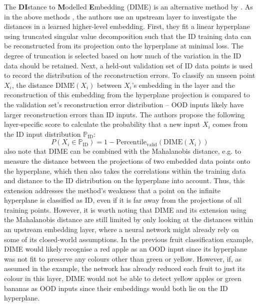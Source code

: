 \newpar The \textbf{DI}stance to \textbf{M}odelled \textbf{E}mbedding (DIME) is an alternative method by \textcite{dime-detector-2021}. As in the above methods \cite{ood-adversarial-detection-2018, ood-class-2022}, the authors use an upstream layer to investigate the distances in a learned higher-level embedding. First, they fit a linear hyperplane using truncated singular value decomposition such that the ID training data can be reconstructed from its projection onto the hyperplane at minimal loss. The degree of truncation is selected based on how much of the variation in the ID data should be retained. Next, a held-out validation set of ID data points is used to record the distribution of the reconstruction errors. To classify an unseen point $X_i$, the distance $\text{DIME}(X_i)$ between $X_i$'s embedding in the layer and the reconstruction of this embedding from the hyperplane projection is compared to the validation set's reconstruction error distribution -- OOD inputs likely have larger reconstruction errors than ID inputs. The authors propose the following layer-specific score to calculate the probability that a new input $X_i$ comes from the ID input distribution $\mathbb{P}_{\text{ID}}$:
\begin{equation} \label{eq:dime-id-percentile}
    P(X_i \in \mathbb{P}_{\text{ID}}) = 1 - \text{Percentile}_{\text{valid}}(\text{DIME}(X_i))
\end{equation}
\citeauthor{dime-detector-2021} also note that DIME can be combined with the Mahalanobis distance, e.g. to measure the distance between the projections of two embedded data points onto the hyperplane, which then also takes the correlations within the training data and distance to the ID distribution on the hyperplane into account. Thus, this extension addresses the method's weakness that a point on the infinite hyperplane is classified as ID, even if it is far away from the projections of all training points. However, it is worth noting that DIME and its extension using the Mahalanobis distance are still limited by only looking at the distances within an upstream embedding layer, where a neural network might already rely on some of its closed-world assumptions. In the previous fruit classification example, DIME would likely recognise a red apple as an OOD input since its hyperplane was not fit to preserve any colours other than green or yellow. However, if, as assumed in the example, the network has already reduced each fruit to just its colour in this layer, DIME would not be able to detect yellow apples or green bananas as OOD inputs since their embeddings would both lie on the ID hyperplane.

